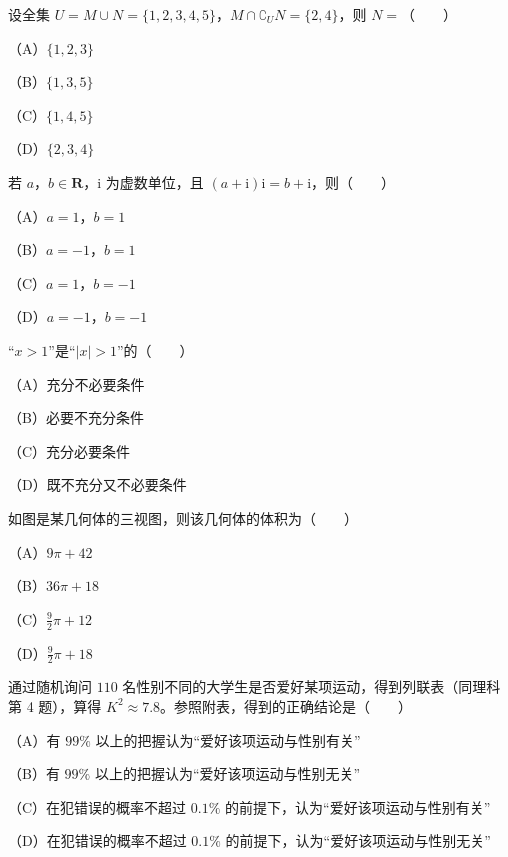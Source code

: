 

\begin{question}
设全集 $U=M\cup N=\{1,2,3,4,5\}$，$M\cap\complement_UN=\{2,4\}$，则 $N=$\mbox{（　　）}

（A）$\{1,2,3\}$

（B）$\{1,3,5\}$

（C）$\{1,4,5\}$

（D）$\{2,3,4\}$

\end{question}
\begin{question}
若 $a$，$b\in\mathbf R$，$\mathrm i$ 为虚数单位，且 $(a+\mathrm i)\mathrm i=b+\mathrm i$，则\mbox{（　　）}

（A）$a=1$，$b=1$

（B）$a=-1$，$b=1$

（C）$a=1$，$b=-1$

（D）$a=-1$，$b=-1$

\end{question}
\begin{question}
“$x>1$”是“$|x|>1$”的\mbox{（　　）}

（A）充分不必要条件

（B）必要不充分条件

（C）充分必要条件

（D）既不充分又不必要条件

\Needspace{0.4\textheight}
\end{question}
\begin{question}
如图是某几何体的三视图，则该几何体的体积为\mbox{（　　）}

（A）$9\pi+42$

（B）$36\pi+18$

（C）$\frac92\pi+12$

（D）$\frac92\pi+18$
\nopagebreak[4]
\begin{center}\end{center}
\nopagebreak[4]
\end{question}
\begin{question}
通过随机询问 $110$ 名性别不同的大学生是否爱好某项运动，得到列联表（同理科第 4 题），算得 $K^2\approx7.8$。参照附表，得到的正确结论是\mbox{（　　）}

（A）有 $99\%$ 以上的把握认为“爱好该项运动与性别有关”

（B）有 $99\%$ 以上的把握认为“爱好该项运动与性别无关”

（C）在犯错误的概率不超过 $0.1\%$ 的前提下，认为“爱好该项运动与性别有关”

（D）在犯错误的概率不超过 $0.1\%$ 的前提下，认为“爱好该项运动与性别无关”

\end{question}
